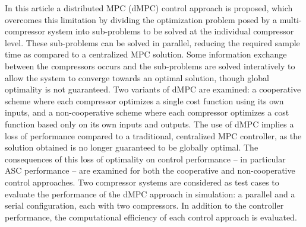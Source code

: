 In this article a distributed MPC (dMPC) control approach is proposed, which overcomes this limitation by dividing the optimization problem posed by a multi-compressor system into sub-problems to be solved at the individual compressor level.
These sub-problems can be solved in parallel, reducing the required sample time as compared to a centralized MPC solution.
Some information exchange between the compressors occurs and the sub-problems are solved interatively to allow the system to converge towards an optimal solution, though global optimality is not guaranteed.
Two variants of dMPC are examined: a cooperative scheme where each compressor optimizes a single cost function using its own inputs, and a non-cooperative scheme where each compressor optimizes a cost function based only on its own inputs and outputs.
The use of dMPC implies a loss of performance compared to a traditional, centralized MPC controller, as the solution obtained is no longer guaranteed to be globally optimal.
The consequences of this loss of optimality on control performance -- in particular ASC performance -- are examined for both the cooperative and non-cooperative control approaches.
Two compressor systems are considered as test cases to evaluate the performance of the dMPC approach in simulation: a parallel and a serial configuration, each with two compressors.
In addition to the controller performance, the computational efficiency of each control approach is evaluated.






